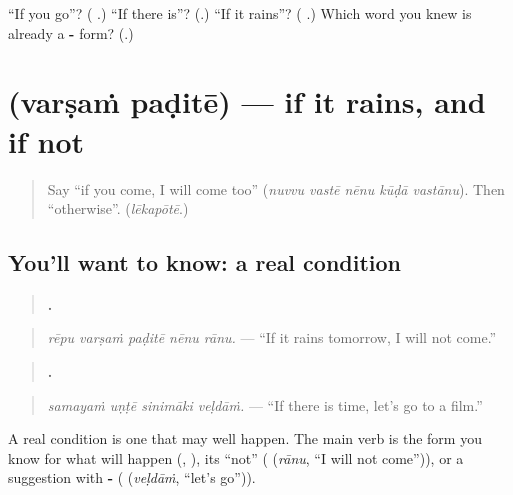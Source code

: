\begin{tcolorbox}[breakable,colback=teal!4,colframe=teal!35!black,title={Before you move on}]
\textquotedblleft{}If you go\textquotedblright{}? (\textbf{ }.) \textquotedblleft{}If there is\textquotedblright{}? (\textbf{}.) \textquotedblleft{}If it rains\textquotedblright{}? (\textbf{ }.) Which word you knew is already a \textbf{-} form? (\textbf{}.)
\end{tcolorbox}
\section[\texorpdfstring{\te{వర్షం} \te{పడితే} (varṣaṁ paḍitē)}{వర్షం పడితే (varṣaṁ paḍitē)}]{  (varṣaṁ paḍitē) — if it rains, and if not}

\label{lesson:TE-C324-varsham-padite}



\begin{quote}
Say \textquotedblleft{}if you come, I will come too\textquotedblright{} (\emph{nuvvu vastē nēnu kūḍā vastānu}). Then \textquotedblleft{}otherwise\textquotedblright{}. (\emph{lēkapōtē}.)
\end{quote}

\subsection*{You'll want to know: a real condition}
\begin{quote}
\textbf{    .}
\end{quote}

\begin{quote}
\emph{rēpu varṣaṁ paḍitē nēnu rānu.} — \textquotedblleft{}If it rains tomorrow, I will not come.\textquotedblright{}
\end{quote}

\begin{quote}
\textbf{   .}
\end{quote}

\begin{quote}
\emph{samayaṁ uṇṭē sinimāki veḷdāṁ.} — \textquotedblleft{}If there is time, let's go to a film.\textquotedblright{}
\end{quote}

A real condition is one that may well happen. The main verb is the form you know for what will happen (\textbf{}, \textbf{}), its \textquotedblleft{}not\textquotedblright{} (\textbf{} (\emph{rānu}, \textquotedblleft{}I will not come\textquotedblright{})), or a suggestion with \textbf{-} (\textbf{} (\emph{veḷdāṁ}, \textquotedblleft{}let's go\textquotedblright{})).

